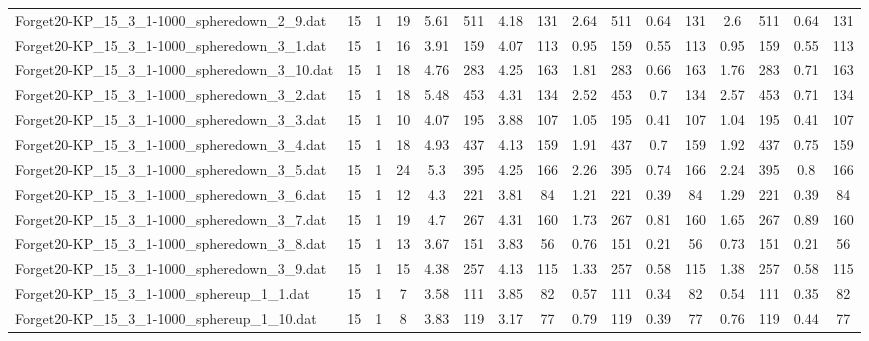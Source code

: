 \begin{sidewaystable}[!ht]
{\begin{tabular}{lccccccccccccccc}
Forget20-KP\_15\_3\_1-1000\_spheredown\_2\_9.dat & 15 & 1 & 19 & 5.61 & 511 & 4.18 & 131 & 2.64 & 511 & 0.64 & 131 & 2.6 & 511 & 0.64 & 131 \\
Forget20-KP\_15\_3\_1-1000\_spheredown\_3\_1.dat & 15 & 1 & 16 & 3.91 & 159 & 4.07 & 113 & 0.95 & 159 & 0.55 & 113 & 0.95 & 159 & 0.55 & 113 \\
Forget20-KP\_15\_3\_1-1000\_spheredown\_3\_10.dat & 15 & 1 & 18 & 4.76 & 283 & 4.25 & 163 & 1.81 & 283 &  \textcolor{blue2}{0.66} & 163 & 1.76 & 283 & 0.71 & 163 \\
Forget20-KP\_15\_3\_1-1000\_spheredown\_3\_2.dat & 15 & 1 & 18 & 5.48 & 453 & 4.31 & 134 & 2.52 & 453 &  \textcolor{blue2}{0.7} & 134 & 2.57 & 453 & 0.71 & 134 \\
Forget20-KP\_15\_3\_1-1000\_spheredown\_3\_3.dat & 15 & 1 & 10 & 4.07 & 195 & 3.88 & 107 & 1.05 & 195 &  \textcolor{blue2}{0.41} & 107 & 1.04 & 195 &  \textcolor{blue2}{0.41} & 107 \\
Forget20-KP\_15\_3\_1-1000\_spheredown\_3\_4.dat & 15 & 1 & 18 & 4.93 & 437 & 4.13 & 159 & 1.91 & 437 &  \textcolor{blue2}{0.7} & 159 & 1.92 & 437 & 0.75 & 159 \\
Forget20-KP\_15\_3\_1-1000\_spheredown\_3\_5.dat & 15 & 1 & 24 & 5.3 & 395 & 4.25 & 166 & 2.26 & 395 &  \textcolor{blue2}{0.74} & 166 & 2.24 & 395 & 0.8 & 166 \\
Forget20-KP\_15\_3\_1-1000\_spheredown\_3\_6.dat & 15 & 1 & 12 & 4.3 & 221 & 3.81 & 84 & 1.21 & 221 &  \textcolor{blue2}{0.39} & 84 & 1.29 & 221 &  \textcolor{blue2}{0.39} & 84 \\
Forget20-KP\_15\_3\_1-1000\_spheredown\_3\_7.dat & 15 & 1 & 19 & 4.7 & 267 & 4.31 & 160 & 1.73 & 267 & 0.81 & 160 & 1.65 & 267 & 0.89 & 160 \\
Forget20-KP\_15\_3\_1-1000\_spheredown\_3\_8.dat & 15 & 1 & 13 & 3.67 & 151 & 3.83 & 56 & 0.76 & 151 &  \textcolor{blue2}{0.21} & 56 & 0.73 & 151 &  \textcolor{blue2}{0.21} & 56 \\
Forget20-KP\_15\_3\_1-1000\_spheredown\_3\_9.dat & 15 & 1 & 15 & 4.38 & 257 & 4.13 & 115 & 1.33 & 257 & 0.58 & 115 & 1.38 & 257 & 0.58 & 115 \\
Forget20-KP\_15\_3\_1-1000\_sphereup\_1\_1.dat & 15 & 1 & 7 & 3.58 & 111 & 3.85 & 82 & 0.57 & 111 &  \textcolor{blue2}{0.34} & 82 & 0.54 & 111 & 0.35 & 82 \\
Forget20-KP\_15\_3\_1-1000\_sphereup\_1\_10.dat & 15 & 1 & 8 & 3.83 & 119 & 3.17 & 77 & 0.79 & 119 &  \textcolor{blue2}{0.39} & 77 & 0.76 & 119 & 0.44 & 77 \\

\end{tabular}}
\end{sidewaystable}
